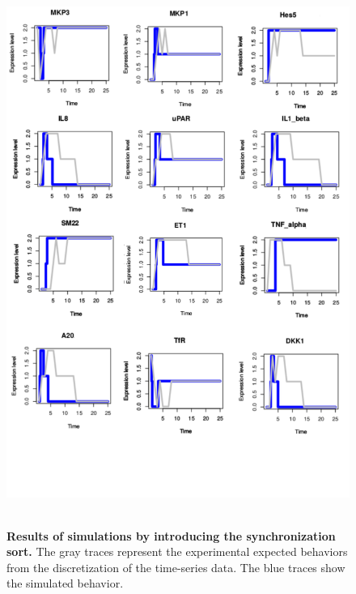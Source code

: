 

\begin{figure}[H]
\centering
\includegraphics[width=5in,height=7in]{images/12genes_sim.png}
\caption{{\bf Results of simulations by introducing the synchronization sort.} The gray traces represent the experimental expected behaviors
from the discretization of the time-series data. The blue traces show the simulated behavior.}
\label{fig:rws}
\end{figure}



